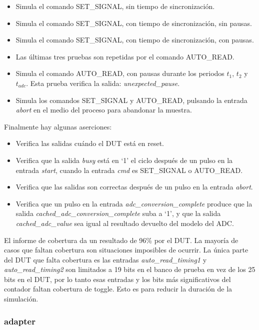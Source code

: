 \documentclass[a4paper, twoside, 11pt]{report}
\begin{document}
\begin{itemize}
  \item Simula el comando SET\_SIGNAL, sin tiempo de sincronización.
  \item Simula el comando SET\_SIGNAL, con tiempo de sincronización, sin pausas.
  \item Simula el comando SET\_SIGNAL, con tiempo de sincronización, con pausas.
  \item Las últimas tres pruebas son repetidas por el comando AUTO\_READ.
  \item Simula el comando AUTO\_READ, con pausas durante los periodos $t_1$, $t_2$ y $t_{adc}$. Esta prueba verifica la salida: \textit{unexpected\_pause}.
  \item Simula los comandos SET\_SIGNAL y AUTO\_READ, pulsando la entrada \textit{abort} en el medio del proceso para abandonar la muestra.
\end{itemize}

Finalmente hay algunas aserciones:

\begin{itemize}
  \item Verifica las salidas cuándo el DUT está en reset.
  \item Verifica que la salida \textit{busy} está en ‘1’ el ciclo después de un pulso en la entrada \textit{start}, cuando la entrada \textit{cmd} es SET\_SIGNAL o AUTO\_READ.
  \item Verifica que las salidas son correctas después de un pulso en la entrada \textit{abort}.
  \item Verifica que un pulso en la entrada \textit{adc\_conversion\_complete} produce que la salida \textit{cached\_adc\_conversion\_complete} suba a ‘1’, y que la salida \textit{cached\_adc\_value} sea igual al resultado devuelto del modelo del ADC.
\end{itemize}

El informe de cobertura da un resultado de 96\% por el DUT. La mayoría de casos que faltan cobertura son situaciones imposibles de ocurrir. La única parte del DUT que falta cobertura es las entradas \textit{auto\_read\_timing1} y \textit{auto\_read\_timing2} son limitados a 19 bits en el banco de prueba en vez de los 25 bits en el DUT, por lo tanto esas entradas y los bits más significativos del contador faltan cobertura de toggle. Esto es para reducir la duración de la simulación.

\FloatBarrier
\subsubsection{adapter}
\end{document}
